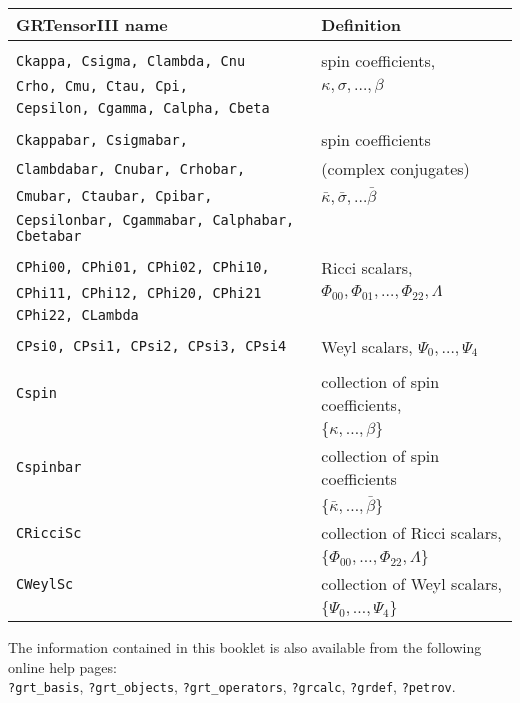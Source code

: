 \documentclass{article}
\begin{document}
\begin{longtable}[c]{p{}p{}}\hline\hline
GRTensorIII name & Definition\\ \hline
& \\
\texttt{Ckappa, Csigma, Clambda, Cnu} & spin coefficients, \\
\texttt{Crho, Cmu, Ctau, Cpi,} & $\kappa, \sigma, \ldots, \beta$\\
\texttt{Cepsilon, Cgamma, Calpha, Cbeta} & \\
& \\
\texttt{Ckappabar, Csigmabar,} & spin coefficients\\
\texttt{Clambdabar, Cnubar, Crhobar,} & (complex conjugates) \\
\texttt{Cmubar, Ctaubar, Cpibar,} & $\bar{\kappa}, \bar{\sigma},
				\ldots \bar{\beta}$ \\
\texttt{Cepsilonbar, Cgammabar, Calphabar, Cbetabar} & \\
& \\
\texttt{CPhi00, CPhi01, CPhi02, CPhi10,} & Ricci scalars, \\
\texttt{CPhi11, CPhi12, CPhi20, CPhi21}  & $\Phi_{00}, \Phi_{01}, \ldots,
				  \Phi_{22}, \Lambda$ \\
\texttt{CPhi22, CLambda} & \\
& \\
\texttt{CPsi0, CPsi1, CPsi2, CPsi3, CPsi4} & Weyl scalars,
				$\Psi_0, \ldots, \Psi_4$\\
& \\
\texttt{Cspin}			& collection of spin coefficients,\\
				& $\{\kappa,\ldots,\beta\}$ \\
\texttt{Cspinbar}		& collection of spin coefficients\\
				& $\{\bar{\kappa},\ldots,\bar{\beta}\}$ \\
\texttt{CRicciSc}		& collection of Ricci scalars, \\
				& $\{\Phi_{00},\ldots,\Phi_{22},\Lambda\}$ \\
\texttt{CWeylSc}		& collection of Weyl scalars, \\
				& $\{\Psi_0,\ldots,\Psi_4\}$\\
\hline
\end{longtable}
%


\vspace*{\fill}
\large
\noindent The information contained in this booklet is also available from the
following online help pages:\\

\noindent\texttt{?grt\_basis}, \texttt{?grt\_objects},
\texttt{?grt\_operators}, \texttt{?grcalc}, \texttt{?grdef}, \texttt{?petrov}.
%
\end{document}
